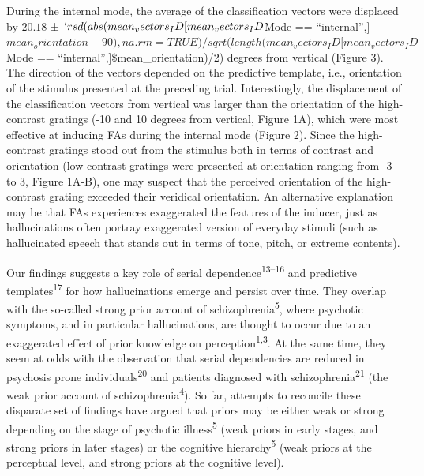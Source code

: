 \documentclass[
]{article}
\begin{document}
During the internal mode, the average of the classification vectors were
displaced by \(20.18\) ±
\(`r sd(abs(mean_vectors_ID[mean_vectors_ID\)Mode ==
``internal'',{]}\(mean_orientation - 90), na.rm = TRUE)/sqrt(length(mean_vectors_ID[mean_vectors_ID\)Mode
== ``internal'',{]}\$mean\_orientation)/2) degrees from vertical (Figure
3). The direction of the vectors depended on the predictive template,
i.e., orientation of the stimulus presented at the preceding trial.
Interestingly, the displacement of the classification vectors from
vertical was larger than the orientation of the high-contrast gratings
(-10 and 10 degrees from vertical, Figure 1A), which were most effective
at inducing FAs during the internal mode (Figure 2). Since the
high-contrast gratings stood out from the stimulus both in terms of
contrast and orientation (low contrast gratings were presented at
orientation ranging from -3 to 3, Figure 1A-B), one may suspect that the
perceived orientation of the high-contrast grating exceeded their
veridical orientation. An alternative explanation may be that FAs
experiences exaggerated the features of the inducer, just as
hallucinations often portray exaggerated version of everyday stimuli
(such as hallucinated speech that stands out in terms of tone, pitch, or
extreme contents).

Our findings suggests a key role of serial
dependence\textsuperscript{13--16} and predictive
templates\textsuperscript{17} for how hallucinations emerge and persist
over time. They overlap with the so-called strong prior account of
schizophrenia\textsuperscript{5}, where psychotic symptoms, and in
particular hallucinations, are thought to occur due to an exaggerated
effect of prior knowledge on perception\textsuperscript{1,3}. At the
same time, they seem at odds with the observation that serial
dependencies are reduced in psychosis prone
individuals\textsuperscript{20} and patients diagnosed with
schizophrenia\textsuperscript{21} (the weak prior account of
schizophrenia\textsuperscript{4}). So far, attempts to reconcile these
disparate set of findings have argued that priors may be either weak or
strong depending on the stage of psychotic illness\textsuperscript{5}
(weak priors in early stages, and strong priors in later stages) or the
cognitive hierarchy\textsuperscript{5} (weak priors at the perceptual
level, and strong priors at the cognitive level).
\end{document}
